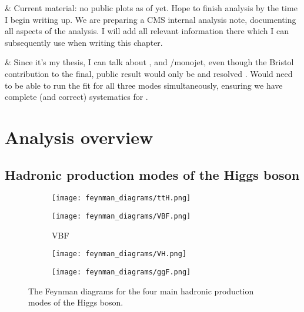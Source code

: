 \begin{easylist}[itemize]
& Current material: no public plots as of yet. Hope to finish analysis by the time I begin writing up. We are preparing a CMS internal analysis note, documenting all aspects of the analysis. I will add all relevant information there which I can subsequently use when writing this chapter.

& Since it's my thesis, I can talk about \ttH, \VH and \ggF/monojet, even though the Bristol contribution to the final, public result would only be \ttH and resolved \VH. Would need to be able to run the fit for all three modes simultaneously, ensuring we have complete (and correct) systematics for \ggF.
\end{easylist}






\section{Analysis overview}
\label{sec:htoinv_overview}




\subsection{Hadronic production modes of the Higgs boson}
\label{subsec:htoinv_production_modes}

\begin{figure}[htbp]
    \centering
    \begin{subfigure}[b]{0.45\textwidth}
        \texttt{[image: feynman\_diagrams/ttH.png]}
        \caption{\ttH}
    \end{subfigure}
    \hfill
    \begin{subfigure}[b]{0.45\textwidth}
        \texttt{[image: feynman\_diagrams/VBF.png]}
        \caption{VBF}
    \end{subfigure}
    \begin{subfigure}[b]{0.45\textwidth}
        \texttt{[image: feynman\_diagrams/VH.png]}
        \caption{\VH}
    \end{subfigure}
    \hfill
    \begin{subfigure}[b]{0.45\textwidth}
        \texttt{[image: feynman\_diagrams/ggF.png]}
        \caption{\ggF}
    \end{subfigure}
\caption[The Feynman diagrams for the four main hadronic production modes of the Higgs boson]{The Feynman diagrams for the four main hadronic production modes of the Higgs boson.}
\label{fig:higgs_feynman_diagrams}
\end{figure}


